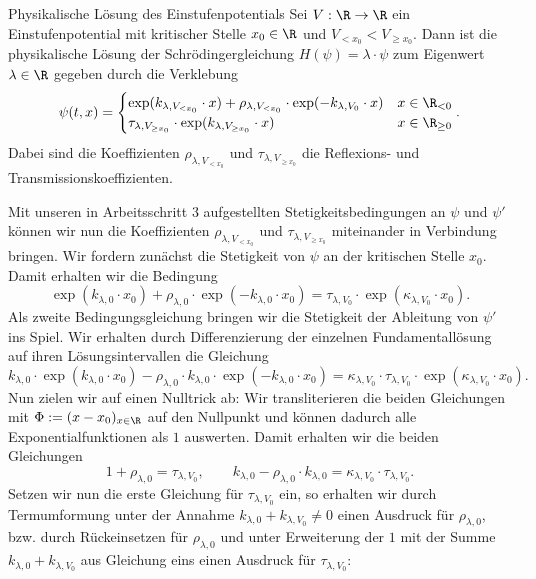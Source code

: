 \documentclass{subfiles}
\begin{document}
        \begin{mdef}{Physikalische Lösung des Einstufenpotentials}
            Sei $V:\R\to\R$ ein Einstufenpotential mit kritischer Stelle $x_0\in\R$ und $V_{<x_0}<V_{\geq x_0}$. Dann ist die physikalische Lösung der Schrödingergleichung $H(\psi) = \lambda\cdot\psi$ zum Eigenwert $\lambda\in\R$ gegeben durch die Verklebung
            \[
                \psi(t,x) = \begin{cases}
                    \exp(k_{\lambda,V_{<x_0}}\cdot x) + \rho_{\lambda,V_{<x_0}}\cdot\exp(-k_{\lambda,V_0}\cdot x) & x \in \R_{<0} \\
                    \tau_{\lambda,V_{\geq x_0}}\cdot\exp(k_{\lambda,V_{\geq x_0}}\cdot x) & x \in \R_{\geq 0}
                \end{cases}.
            \]
            Dabei sind die Koeffizienten $\rho_{\lambda,V_{< x_0}}$ und $\tau_{\lambda,V_{\geq x_0}}$ die Reflexions- und Transmissionskoeffizienten.
        \end{mdef}
        Mit unseren in Arbeitsschritt 3 aufgestellten Stetigkeitsbedingungen an $\psi$ und $\psi'$ können wir nun die Koeffizienten $\rho_{\lambda,V_{< x_0}}$ und $\tau_{\lambda,V_{\geq x_0}}$ miteinander in Verbindung bringen. Wir fordern zunächst die Stetigkeit von $\psi$ an der kritischen Stelle $x_0$. Damit erhalten wir die Bedingung
        \[
            \exp(k_{\lambda,0}\cdot x_0) + \rho_{\lambda,0}\cdot\exp(-k_{\lambda,0}\cdot x_0) = \tau_{\lambda,V_0}\cdot\exp(\kappa_{\lambda,V_0}\cdot x_0).
        \]
        Als zweite Bedingungsgleichung bringen wir die Stetigkeit der Ableitung von $\psi'$ ins Spiel. Wir erhalten durch Differenzierung der einzelnen Fundamentallösung auf ihren Lösungsintervallen die Gleichung
        \[
            k_{\lambda,0}\cdot\exp(k_{\lambda,0}\cdot x_0) - \rho_{\lambda,0}\cdot k_{\lambda,0}\cdot\exp(-k_{\lambda,0}\cdot x_0) = \kappa_{\lambda,V_0}\cdot\tau_{\lambda,V_0}\cdot\exp(\kappa_{\lambda,V_0}\cdot x_0).
        \] 
        Nun zielen wir auf einen Nulltrick ab: Wir transliterieren die beiden Gleichungen mit $\Phi:=(x-x_0)_{x\in\R}$ auf den Nullpunkt und können dadurch alle Exponentialfunktionen als $1$ auswerten. Damit erhalten wir die beiden Gleichungen
        \[
            1+\rho_{\lambda,0} = \tau_{\lambda,V_0},\qquad k_{\lambda,0} - \rho_{\lambda,0}\cdot k_{\lambda,0} = \kappa_{\lambda,V_0}\cdot\tau_{\lambda,V_0}.
        \]
        Setzen wir nun die erste Gleichung für $\tau_{\lambda,V_0}$ ein, so erhalten wir durch Termumformung unter der Annahme $k_{\lambda,0} + k_{\lambda,V_0}\neq 0$ einen Ausdruck für $\rho_{\lambda,0}$, bzw. durch Rückeinsetzen für $\rho_{\lambda,0}$ und unter Erweiterung der $1$ mit der Summe $k_{\lambda,0} + k_{\lambda,V_0}$ aus Gleichung eins einen Ausdruck für $\tau_{\lambda,V_0}$:
\end{document}
